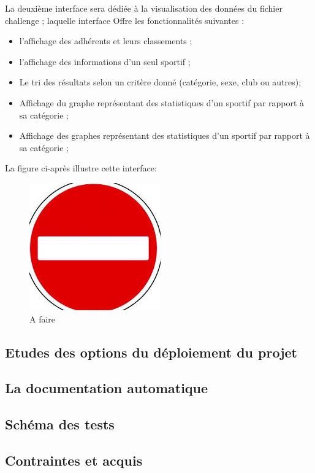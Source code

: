La deuxième interface sera dédiée à la visualisation des données du fichier challenge ; laquelle interface 
Offre les fonctionnalités suivantes : 
\begin{itemize} 
\item l’affichage des adhérents et leurs classements ; 
 \item l’affichage des informations d’un seul sportif ;
 \item Le tri des résultats selon un critère donné (catégorie, sexe, club ou autres);
 \item Affichage du graphe représentant des statistiques d’un sportif par rapport à sa catégorie ;
 \item Affichage des graphes représentant des statistiques d’un sportif par rapport à sa catégorie ;
\end{itemize} 
La figure ci-après illustre cette interface:
\begin{figure}
	  \center
	  \includegraphics[scale=0.5]{img/A_faire.png}
	   \caption {A faire }
\end{figure}


\subsection {Etudes des options du déploiement du projet }

\subsection {La documentation automatique  }
\subsection {Schéma des tests }

\subsection {Contraintes et acquis }
\newpage
